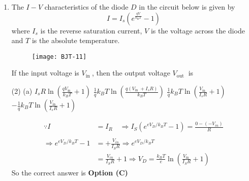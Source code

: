 \begin{enumerate}
\begin{answer}
\begin{align*}
&=\frac{100 \Omega \times 2 M \Omega}{100 \Omega+2 M \Omega} \approx 100 \Omega\\
\text{So }V_{A}&=\frac{100}{360} \times 12 V=\frac{10}{3} V
\intertext{\textbf{Case B:} Voltmeter internal resistance is $0.1 \mathrm{k} \Omega=100 \Omega$, so equivalent resistance across ac is}
&=\frac{100 \Omega \times 100 \Omega}{100 \Omega+100 \Omega}=50 \Omega\\
\text{So }V_{B}&=\frac{50}{310} \times 12 V=\frac{600}{310} V=\frac{60}{31} V\\
\Rightarrow \frac{V_{A}}{V_{B}}&=\frac{10 / 3}{60 / 31}=\frac{10}{60} \times \frac{31}{3}=1.72
\end{align*}
So the correct answer is \textbf{Option (B)}
\end{answer}
\item The $I-V$ characteristics of the diode $D$ in the circuit below is given by
$$
I=I_{s}\left(e^{\frac{q V}{k_{\mathrm{B}} T}}-1\right)
$$
where $I_{s}$ is the reverse saturation current, $V$ is the voltage across the diode and $T$ is the absolute temperature.\\
\begin{figure}[H]
	\centering
	\texttt{[image: BJT-11]}
\end{figure}
If the input voltage is $V_{\text {in }}$, then the output voltage $V_{\text {out }}$ is
{}
\begin{tasks}(2)
\task[\textbf{A.}] (a) $I_{s} R \ln \left(\frac{q V_{\text {in }}}{k_{B} T}+1\right)$
\task[\textbf{B.}] $\frac{1}{q} k_{B} T \ln \left(\frac{q\left(V_{\text {in }}+I_{s} R\right)}{k_{B} T}\right)$
\task[\textbf{C.}]  $\frac{1}{q} k_{B} T \ln \left(\frac{V_{\text {in }}}{I_{s} R}+1\right)$
\task[\textbf{D.}]  $-\frac{1}{q} k_{B} T \ln \left(\frac{V_{\text {in }}}{I_{s} R}+1\right)$
\end{tasks}
\begin{answer}
\begin{align*}
\because I&=I_{R} \quad \Rightarrow I_{S}\left(e^{e V_{D} / k_{B} T}-1\right)=\frac{0-\left(-V_{i n}\right)}{R}\\
\\\Rightarrow e^{e V_{D} / k_{B} T}-1&=+\frac{V_{i n}}{I_{S} R} \Rightarrow e^{e V_{D} / k_{B} T}\\&=\frac{V_{i n}}{I_{S} R}+1 \Rightarrow V_{D}=\frac{k_{B} T}{e} \ln \left(\frac{V_{\text {in }}}{I_{S} R}+1\right)
\end{align*}
So the correct answer is \textbf{Option (C)}
\end{answer}
\end{enumerate}
